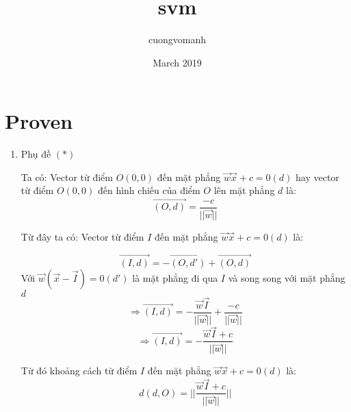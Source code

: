 \documentclass{article}
\title{svm}
\author{cuongvomanh}
\date{March 2019}
\begin{document}
    \section{Proven}
    \begin{enumerate}
        \item Phụ đề $(*)$
          
        Ta có:
        Vector từ điểm $O(0,0)$ đến mặt phẳng $\vec{w}\vec{x} + c = 0 (d)$ 
        hay vector từ điểm $O(0,0)$ đến hình chiếu của điểm $O$ lên 
        mặt phẳng $d$ là:
        $$\vec{(O,d)} = \frac{-c}{||\vec{w}||}$$

        Từ đây ta có:
        Vector từ điểm $I$ đến mặt phẳng $\vec{w}\vec{x} + c = 0 (d)$ là:
        
        $$\vec{(I,d)} = -\vec{(O,d')} + \vec{(O,d)}$$
        Với $\vec{w}(\vec{x} - \vec{I}) = 0 (d')$ 
        là mặt phẳng đi qua $I$ và song song với mặt phẳng $d$
        $$\Rightarrow \vec{(I,d)} = -\frac{\vec{w}\vec{I}}{||\vec{w}||} +  \frac{-c}{||\vec{w}||}$$
        $$\Rightarrow \vec{(I,d)} = -\frac{\vec{w}\vec{I}+c}{||\vec{w}||}$$

        Từ đó khoảng cách từ điểm $I$ đến mặt phẳng $\vec{w}\vec{x} + c = 0 (d)$ là:
        $$d(d,O) = ||\frac{\vec{w}\vec{I}+c}{||\vec{w}||}|| $$
        


\end{enumerate}
\end{document}
